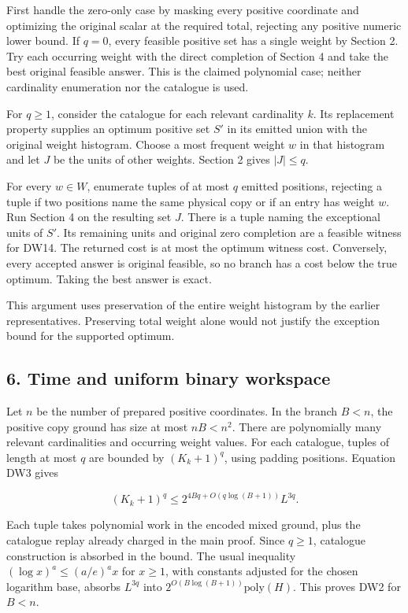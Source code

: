 First handle the zero-only case by masking every positive coordinate and optimizing the original scalar at the required total, rejecting any positive numeric lower bound. If \(q=0\), every feasible positive set has a single weight by Section 2. Try each occurring weight with the direct completion of Section 4 and take the best original feasible answer. This is the claimed polynomial case; neither cardinality enumeration nor the catalogue is used.

For \(q\ge1\), consider the catalogue for each relevant cardinality \(k\). Its replacement property supplies an optimum positive set \(S'\) in its emitted union with the original weight histogram. Choose a most frequent weight \(w\) in that histogram and let \(J\) be the units of other weights. Section 2 gives \(|J|\le q\).

For every \(w\in W\), enumerate tuples of at most \(q\) emitted positions, rejecting a tuple if two positions name the same physical copy or if an entry has weight \(w\). Run Section 4 on the resulting set \(J\). There is a tuple naming the exceptional units of \(S'\). Its remaining units and original zero completion are a feasible witness for DW14. The returned cost is at most the optimum witness cost. Conversely, every accepted answer is original feasible, so no branch has a cost below the true optimum. Taking the best answer is exact.

This argument uses preservation of the entire weight histogram by the earlier representatives. Preserving total weight alone would not justify the exception bound for the supported optimum.

\hypertarget{af-fe230a140d-time-and-uniform-binary-workspace}{%
\subsection{6. Time and uniform binary workspace}\label{af-fe230a140d-time-and-uniform-binary-workspace}}

Let \(n\) be the number of prepared positive coordinates. In the branch \(B<n\), the positive copy ground has size at most \(nB<n^2\). There are polynomially many relevant cardinalities and occurring weight values. For each catalogue, tuples of length at most \(q\) are bounded by \((K_k+1)^q\), using padding positions. Equation DW3 gives

\[
(K_k+1)^q
\le 2^{4Bq+O(q\log(B+1))}L^{3q}.
\tag{DW15}
\]

Each tuple takes polynomial work in the encoded mixed ground, plus the catalogue replay already charged in the main proof. Since \(q\ge1\), catalogue construction is absorbed in the bound. The usual inequality \((\log x)^a\le(a/e)^a x\) for \(x\ge1\), with constants adjusted for the chosen logarithm base, absorbs \(L^{3q}\) into \(2^{O(B\log(B+1))}\mathrm{poly}(H)\). This proves DW2 for \(B<n\).

